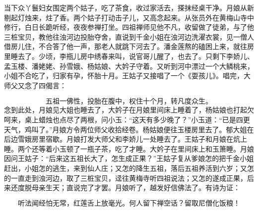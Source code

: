 当下众丫鬟妇女围定两个姑子，吃了茶食，收过家活去，搽抹经桌干净。月娘从新剔起灯烛来，炷了香。两个姑子打动击子儿，又高念起来。从张员外在黄梅山寺中修行，白日长跪听经，夜夜参禅打坐。四祖禅师见他不凡，收留做了徒弟，与了他三桩宝贝，教他往浊河边投胎夺舍，直说到千金小姐在浊河边洗濯衣裳，见一僧人借房儿住，不合答了他一声，那老人就跳下河去了。潘金莲熬的磕困上来，就往房里睡去了。少顷，李瓶儿房中绣春来叫，说官哥儿醒了，也去了。只剩下李娇儿、孟玉楼、潘姥姥、孙雪娥、杨姑娘、大妗子守着。又听到河中漂过一个大鳞桃来，小姐不合吃了，归家有孕，怀胎十月。王姑子又接唱了一个《耍孩儿》。唱完，大师父又念了四偈言：

\[
五祖一佛性，投胎在腹中，
权住十个月，转凡度众生。
\]
念到此处，月娘见大姐也睡去了，大妗子在月娘里间床上睡着了，杨姑娘也打起欠呵来，桌上蜡烛也点尽了两根，问小玉：“这天有多少晚了？”小玉道：“已是四更天气，鸡叫了。”月娘方令两位师父收拾经卷。杨姑娘便往玉楼房里去了。郁大姐在后边雪娥房里宿歇。月娘打发大师父和李娇儿一处睡去了。王姑子和月娘在炕上睡。两个还等着小玉顿了一瓶子茶，吃了才睡。大妗子在里间床上和玉箫睡。月娘因问王姑子：“后来这五祖长大了，怎生成正果？”王姑子复从爹娘怎的把千金小姐赶出，小姐怎的逃生，来到仙人庄；又怎的降生五祖，落后五祖养活到六岁；又怎的一直走到浊河边，取了三桩宝贝，迳往黄梅寺听四祖说法；又怎的遂成正果，后来还度脱母亲生天；直说完了才罢。月娘听了，越发好信佛法了。有诗为证：

\[
听法闻经怕无常，红莲舌上放毫光。
何人留下禅空话？留取尼僧化饭粮！
\]
